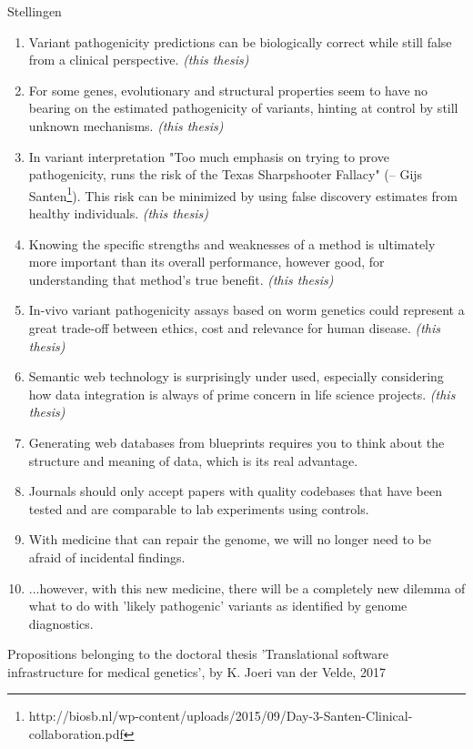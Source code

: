 \documentclass[10pt]{article}
\begin{document}
\thispagestyle{empty}

\Large
Stellingen

\small

\begin{enumerate}

  \item Variant pathogenicity predictions can be biologically correct while still false from a clinical perspective. \textsl{(this thesis)}

  \item For some genes, evolutionary and structural properties seem to have no bearing on the estimated pathogenicity of variants, hinting at control by still unknown mechanisms. \textsl{(this thesis)}

  \item In variant interpretation "Too much emphasis on trying to prove pathogenicity, runs the risk of the Texas Sharpshooter Fallacy" (-- Gijs Santen\footnote{\tiny http://biosb.nl/wp-content/uploads/2015/09/Day-3-Santen-Clinical-collaboration.pdf}). This risk can be minimized by using false discovery estimates from healthy individuals. \textsl{(this thesis)}

  \item Knowing the specific strengths and weaknesses of a method is ultimately more important than its overall performance, however good, for understanding that method's true benefit. \textsl{(this thesis)}

  \item In-vivo variant pathogenicity assays based on worm genetics could represent a great trade-off between ethics, cost and relevance for human disease. \textsl{(this thesis)}

  \item Semantic web technology is surprisingly under used, especially considering how data integration is always of prime concern in life science projects. \textsl{(this thesis)}

  \item Generating web databases from blueprints requires you to think about the structure and meaning of data, which is its real advantage.

  \item Journals should only accept papers with quality codebases that have been tested and are comparable to lab experiments using controls.

  \item With medicine that can repair the genome, we will no longer need to be afraid of incidental findings.
  
  \item ...however, with this new medicine, there will be a completely new dilemma of what to do with 'likely pathogenic' variants as identified by genome diagnostics.
  
\end{enumerate}

\noindent
Propositions belonging to the doctoral thesis 'Translational software infrastructure for medical genetics', by K. Joeri van der Velde, 2017
\end{document}

